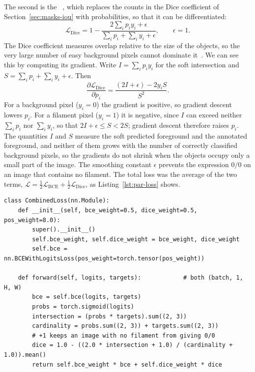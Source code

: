 The second is the ~\citep{vnet}, which replaces the counts in the Dice coefficient of
Section~\ref{sec:masks-iou} with probabilities, so that it can be differentiated:
\begin{equation}
\mathcal{L}_{\mathrm{Dice}} = 1 - \frac{2\sum_i p_i y_i + \epsilon}{\sum_i p_i + \sum_i y_i + \epsilon},
\qquad \epsilon = 1.
\label{eq:par-dice}
\end{equation}
The Dice coefficient measures overlap relative to the size of the objects, so the very large number
of easy background pixels cannot dominate it~\citep{sudre2017}. We can see this by computing its gradient. Write
$I=\sum_i p_i y_i$ for the soft intersection and $S=\sum_i p_i+\sum_i y_i+\epsilon$. Then
\begin{equation}
\frac{\partial\mathcal{L}_{\mathrm{Dice}}}{\partial p_i} = \frac{(2I+\epsilon) - 2y_iS}{S^2}.
\end{equation}
For a background pixel ($y_i=0$) the gradient is positive, so gradient descent lowers $p_i$. For a
filament pixel ($y_i=1$) it is negative, since $I$ can exceed neither $\sum_i p_i$ nor $\sum_i y_i$,
so that $2I+\epsilon\le S<2S$; gradient descent therefore raises $p_i$. The quantities $I$ and
$S$ measure the soft predicted foreground and the annotated foreground, and neither of them grows
with the number of correctly classified background pixels, so the gradients do not shrink when the
objects occupy only a small part of the image. The smoothing
constant $\epsilon$ prevents the expression $0/0$ on an image that contains no filament. The total
loss was the average of the two terms, $\mathcal{L}=\tfrac12\mathcal{L}_{\mathrm{BCE}}+\tfrac12
\mathcal{L}_{\mathrm{Dice}}$, as Listing~\ref{lst:par-loss} shows.

\begin{lstlisting}[caption={Weighted cross-entropy plus soft Dice. Condensed from
\file{experiments/exp\_001\_baseline/src/model.py}.},label=lst:par-loss]
class CombinedLoss(nn.Module):
    def __init__(self, bce_weight=0.5, dice_weight=0.5, pos_weight=8.0):
        super().__init__()
        self.bce_weight, self.dice_weight = bce_weight, dice_weight
        self.bce = nn.BCEWithLogitsLoss(pos_weight=torch.tensor(pos_weight))

    def forward(self, logits, targets):            # both (batch, 1, H, W)
        bce = self.bce(logits, targets)
        probs = torch.sigmoid(logits)
        intersection = (probs * targets).sum((2, 3))
        cardinality = probs.sum((2, 3)) + targets.sum((2, 3))
        # +1 keeps an image with no filament from giving 0/0
        dice = 1.0 - ((2.0 * intersection + 1.0) / (cardinality + 1.0)).mean()
        return self.bce_weight * bce + self.dice_weight * dice
\end{lstlisting}

